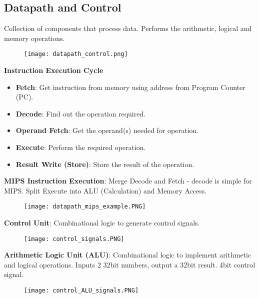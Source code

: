 \documentclass[a4paper,landscape]{article}
\newcommand{\rntopic}[1]{\vspace{-2.0em}\subsection*{#1}\vspace{-1.0em}}
\newcommand{\rnname}[1]{\textbf{#1}}
\begin{document}
\begin{multicols*}{4}
\rntopic{Datapath and Control}
\begin{flatitemize}
\item Collection of components that process data. Performs the arithmetic, logical and memory operations.
\vspace{-1.5em}
\begin{figure}[H]
  \texttt{[image: datapath\_control.png]}
\end{figure}
\vspace{-1.5em}
\item \rnname{Instruction Execution Cycle}
\vspace{-1em}
\begin{itemize}
\item \textbf{Fetch}: Get instruction from memory using address from Program Counter (PC).
\item \textbf{Decode}: Find out the operation required.
\item \textbf{Operand Fetch}: Get the operand(s) needed for operation.
\item \textbf{Execute}: Perform the required operation.
\item \textbf{Result Write (Store)}: Store the result of the operation.
\end{itemize}
\item \rnname{MIPS Instruction Execution}: Merge Decode and Fetch - decode is simple for MIPS. Split Execute into ALU (Calculation) and Memory Access.
\vspace{-1.5em}
\begin{figure}[H]
  \texttt{[image: datapath\_mips\_example.PNG]}
\end{figure}
\vspace{-1.5em}
\item \rnname{Control Unit}:
Combinational logic to generate control signals.
\vspace{-1em}
\begin{figure}[H]
  \texttt{[image: control\_signals.PNG]}
\end{figure}
\vspace{-1.5em}
\item \rnname{Arithmetic Logic Unit (ALU)}:
Combinational logic to implement arithmetic and logical operations. Inputs 2 32bit numbers, output a 32bit result. 4bit control signal.
\vspace{-1em}
\begin{figure}[H]
  \texttt{[image: control\_ALU\_signals.PNG]}
\end{figure}
\vspace{-1.5em}
\end{flatitemize}



\end{multicols*}
\end{document}
